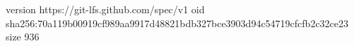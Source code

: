 version https://git-lfs.github.com/spec/v1
oid sha256:70a119b00919cf989aa9917d48821bdb327bce3903d94c54719cfcfb2c32ce23
size 936
